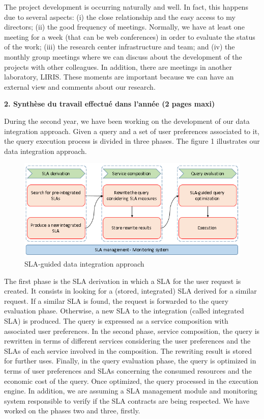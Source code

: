\documentclass[11pt,a4paper,oneside]{report}
\begin{document}
The project development is occurring naturally and well. In fact, this happens due to several aspects: (i) the close relationship and the easy access to my directors; (ii) the good frequency of meetings. Normally, we have at least one meeting for a week (that can be web conferences) in order to evaluate the status of the work; (iii) the research center infrastructure and team; and (iv) the monthly group meetings where we can discuss about the development of the projects with other colleagues. In addition, there are meetings in another laboratory, LIRIS. These moments are important because we can have an external view and comments about our research.

\newpage
\begin{flushleft}
\textbf{2. Synthèse du travail effectué dans l’année (2 pages maxi)}\\
\end{flushleft}

During the second year, we have been working on the development of our data integration approach. Given a query and a set of user preferences associated to it, the query execution process is divided in three phases. The figure 1 illustrates our data integration approach.

\begin{figure}[h!]
\center
\includegraphics[scale=0.7]{../../general_approach.PNG} 
\caption{SLA-guided data integration approach}
\end{figure}

The first phase is the SLA derivation in which a SLA for the user request is created. It consists in looking for a (stored, integrated) SLA derived for a similar request. If a similar SLA is found, the request is forwarded to the query evaluation phase. Otherwise, a new SLA to the integration (called integrated SLA) is produced. The query is expressed as a service composition with associated user preferences. In the second phase, service composition, the query is rewritten in terms of different services considering the user preferences and the SLAs of each service involved in the composition. The rewriting result is stored for further uses. Finally, in the query evaluation phase, the query is optimized in terms of user preferences and SLAs concerning the consumed resources and the economic cost of the query. Once optimized, the query processed in the execution engine. In addition, we are assuming a SLA management module and monitoring system responsible to verify if the SLA contracts are being respected. We have worked on the phases two and three, firstly. 
	
\end{document}
